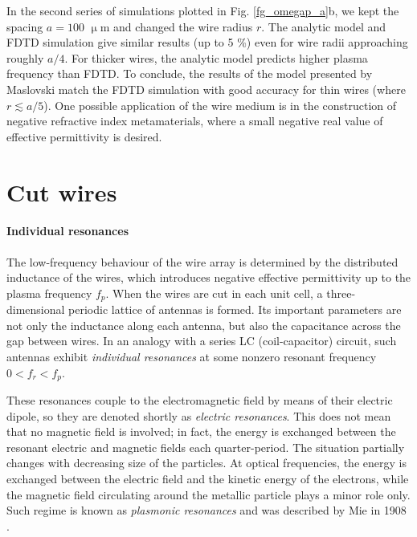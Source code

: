 In the second series of simulations plotted in Fig.  \ref{fg_omegap_a}b, we kept the spacing $a = 100$ $\upmu$m and changed the wire radius $r$. The analytic model and FDTD simulation give similar results (up to 5 \%) even for wire radii approaching roughly $a/4$. For thicker wires, the analytic model predicts higher plasma frequency than FDTD.  To conclude, the results of the model presented by Maslovski match the FDTD simulation with good accuracy for thin wires (where $r \lesssim a/5$). One possible application of the wire medium is in the construction of negative refractive index metamaterials, where a small negative real value of effective permittivity is desired.%



\FloatBarrier %
\section{Cut wires} \label{section_cutwires}
\paragraph{Individual resonances}%
The low-frequency behaviour of the wire array is determined by the distributed inductance of the wires, which introduces negative effective permittivity up to the plasma frequency $f_p$. When the wires are cut in each unit cell, a three-dimensional periodic lattice of antennas is formed. Its important parameters are not only the inductance along each antenna, but also the capacitance across the gap between wires. In an analogy with a series LC (coil-capacitor) circuit, such antennas exhibit \textit{individual resonances} at some nonzero resonant frequency $0<f_r<f_p$. 

These resonances couple to the electromagnetic field by means of their electric dipole, so they are denoted shortly as \textit{electric resonances}. This does not mean that no magnetic field is involved; in fact, the energy is exchanged between the resonant electric and magnetic fields each quarter-period. The situation partially changes with decreasing size of the particles. At optical frequencies, the energy is exchanged between the electric field and the kinetic energy of the electrons, while the magnetic field circulating around the metallic particle plays a minor role only. Such regime is known as \textit{plasmonic resonances} and was described by Mie in 1908 \cite{mie1908beitrage}.

